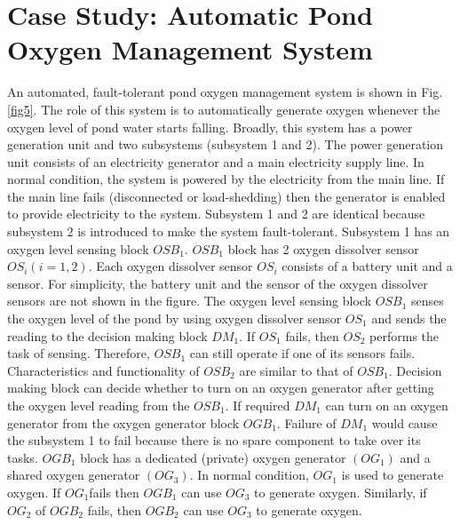 \documentclass[10pt]{llncs}
\begin{document}
\section{Case Study: Automatic Pond Oxygen Management System}
\label{sec:3}
An automated, fault-tolerant pond oxygen management system is shown in Fig.\ref{fig5}. The role of this system is to automatically generate oxygen whenever the oxygen level of pond water starts falling. Broadly, this system has a power generation unit and two subsystems (subsystem 1 and 2). The power generation unit consists of an electricity generator and a main electricity supply line. In normal condition, the system is powered by the electricity from the main line. If the main line fails (disconnected or load-shedding) then the generator is enabled to provide electricity to the system. Subsystem 1 and 2 are identical because subsystem 2 is introduced to make the system fault-tolerant. 
Subsystem 1 has an oxygen level sensing block ${OSB}_1$. ${OSB}_1$ block has 2 oxygen dissolver sensor ${OS}_i \left(i=1,2\right)$. Each oxygen dissolver sensor ${OS}_i$ consists of a battery unit and a sensor. For simplicity, the battery unit and the sensor of the oxygen dissolver sensors are not shown in the figure. The oxygen level sensing block ${OSB}_1$ senses the oxygen level of the pond by using oxygen dissolver sensor ${OS}_1$ and sends the reading to the decision making block ${DM}_1 $. If  ${OS}_1$ fails, then ${OS}_2$  performs the task of sensing. Therefore, ${OSB}_1$ can still operate if one of its sensors fails. Characteristics and functionality of ${OSB}_2$ are similar to that of ${OSB}_1$. Decision making block can decide whether to turn on an oxygen generator after getting the oxygen level reading from the ${OSB}_1$. If required ${DM}_1$ can turn on an oxygen generator from the oxygen generator block ${OGB}_1$. Failure of ${DM}_1$ would cause the subsystem 1 to fail because there is no spare component to take over its tasks. ${OGB}_1$ block has a dedicated (private) oxygen generator $\left({OG}_1\right)$ and a shared oxygen generator $\left({OG}_3\right)$. In normal condition, ${OG}_1$ is used to generate oxygen. If  ${OG}_1$fails then  ${OGB}_1$ can use ${OG}_3$ to generate oxygen. Similarly, if ${OG}_2$ of ${OGB}_2$ fails, then ${OGB}_2$ can use ${OG}_3$ to generate oxygen.   
\end{document}
